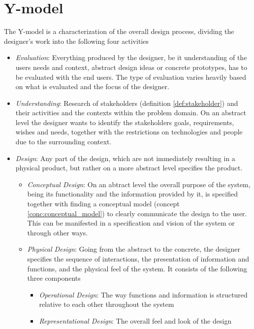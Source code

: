 \section{Y-model} \label{sec:y_model} 
The Y-model is a characterization of the overall design process, dividing the designer's work into the following four activities
\begin{itemize}
\item \emph{Evaluation}:
  Everything produced by the designer, be it understanding of the users needs and context, abstract design ideas or concrete prototypes, has to be evaluated with the end users. The type of evaluation varies heavily based on what is evaluated and the focus of the designer.
\item \emph{Understanding}:
  Research of stakeholders (definition \ref{def:stakeholder}) and their activities and the contexts within the problem domain. On an abstract level the designer wants to identify the stakeholders goals, requirements, wishes and needs, together with the restrictions on technologies and people due to the surrounding context.
\item \emph{Design}:
  Any part of the design, which are not immediately resulting in a physical product, but rather on a more abstract level specifies the product.
  \begin{itemize}
  \item \emph{Conceptual Design}:
    On an abtract level the overall purpose of the system, being its functionality and the information provided by it, is specified together with finding a conceptual model (concept \ref{conc:conceptual_model}) to clearly communicate the design to the user. This can be manifested in a specification and vision of the system or through other ways.
    
  \item \emph{Physical Design}:
    Going from the abstract to the concrete, the designer specifies the sequence of interactions, the presentation of information and functions, and the physical feel of the system. It consists of the following three components
    \begin{itemize}
    \item \emph{Operational Design}:
      The way functions and information is structured relative to each other throughout the system
      
    \item \emph{Representational Design}:
      The overall feel and look of the design
      

\end{itemize}
\end{itemize}
\end{itemize}
